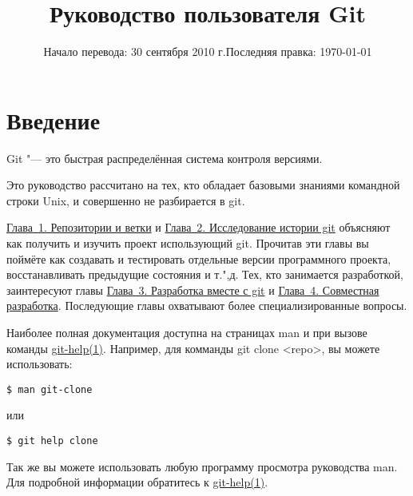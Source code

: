 \documentclass[a4paper, 12pt]{report}
\title{Руководство пользователя Git}
\date{Начало перевода: 30 сентября 2010 г.\linebreak Последняя правка: \today}
\begin{document}
\lstset{language=bash, 
		frame=trbl,
		frameround=tttt,
		basicstyle=\ttfamily\small , 
		keywordstyle=\textbf ,		
		commentstyle=\textit
		}

\maketitle
\tableofcontents


%
%
\newpage
\section*{Введение}
\hypertarget{#preface}{}

Git "--- это быстрая распределённая система контроля версиями.

Это руководство рассчитано на тех, кто обладает базовыми знаниями командной
строки Unix, и совершенно не разбирается в git.

\href{#chapter1}{Глава~1. Репозитории и ветки} и 
\href{#chapter2}{Глава~2. Исследование истории git} объясняют как 
получить и изучить проект использующий git. Прочитав эти главы вы поймёте как 
создавать и тестировать отдельные версии программного проекта, восстанавливать 
предыдущие состояния и т.",д. Тех, кто занимается разработкой, заинтересуют главы
\href{#chapter3}{Глава~3. Разработка вместе с git} и 
\href{#chapter4}{Глава~4. Совместная разработка}. Последующие главы 
охватывают более специализированные вопросы.

Наиболее полная документация доступна на страницах \textsf{man} и при вызове
команды \href{http://www.kernel.org/pub/software/scm/git/docs/git-help.html}
{git-help(1)}. Например, для комманды \textsf{git clone <repo>}, вы 
можете использовать:

\begin{lstlisting}
$ man git-clone
\end{lstlisting}

или

\begin{lstlisting}
$ git help clone
\end{lstlisting}

Так же вы можете использовать любую программу просмотра руководства
\textsf{man}.
Для подробной информации обратитесь к 
\href{http://www.kernel.org/pub/software/scm/git/docs/git-help.html}
{git-help(1)}.
\end{document}
